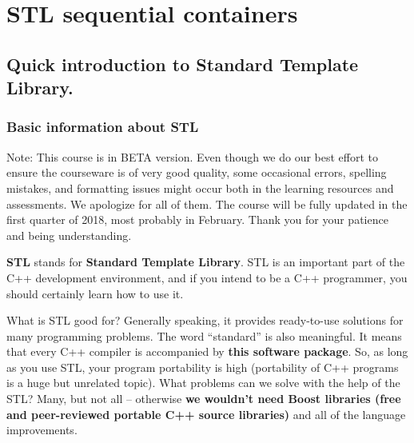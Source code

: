 
\chapter{STL sequential containers}  %

\ifpdf
    \graphicspath{{Chapter1/Figs/Raster/}{Chapter1/Figs/PDF/}{Chapter1/Figs/}}
\else
    \graphicspath{{Chapter1/Figs/Vector/}{Chapter1/Figs/}}
\fi



\section{Quick introduction to Standard Template Library.}
\subsection{Basic information about STL} %

Note: This course is in BETA version. Even though we do our best effort to ensure 
the courseware is of very good quality, some occasional errors, spelling mistakes, 
and formatting issues might occur both in the learning resources and assessments. 
We apologize for all of them. The course will be fully updated in the first 
quarter of 2018, most probably in February. Thank you for your patience and 
being understanding.

\textbf{STL} stands for \textbf{Standard Template Library}. STL is an important 
part of the C++ development environment, and if you intend to be a C++ programmer, 
you should certainly learn how to use it.

What is STL good for? Generally speaking, it provides ready-to-use solutions for 
many programming problems. The word “standard” is also meaningful. It means that 
every C++ compiler is accompanied by \textbf{this software package}. So, as long 
as you use STL, your program portability is high (portability of C++ programs is 
a huge but unrelated topic). What problems can we solve with the help of the STL? 
Many, but not all – otherwise \textbf{we wouldn’t need Boost libraries (free and 
peer-reviewed portable C++ source libraries)} and all of the language improvements.

